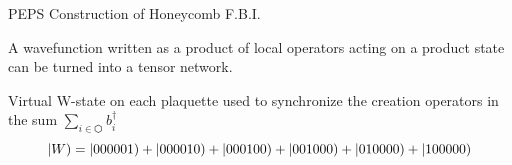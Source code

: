 \begin{block}{PEPS Construction of Honeycomb F.B.I.}

A wavefunction written as a product of local operators acting on a product state can be turned into a tensor network.


\begin{figure}[h]
\end{figure}

Virtual W-state on each plaquette used to synchronize the creation operators in the sum $\sum\limits_{i \in \varhexagon} b^{\dagger}_i$
$$\left |W \right ) = \left |000001 \right )+\left |000010 \right )+\left |000100 \right )+\left |001000 \right )+\left |010000 \right )+\left |100000 \right )$$


\end{block}